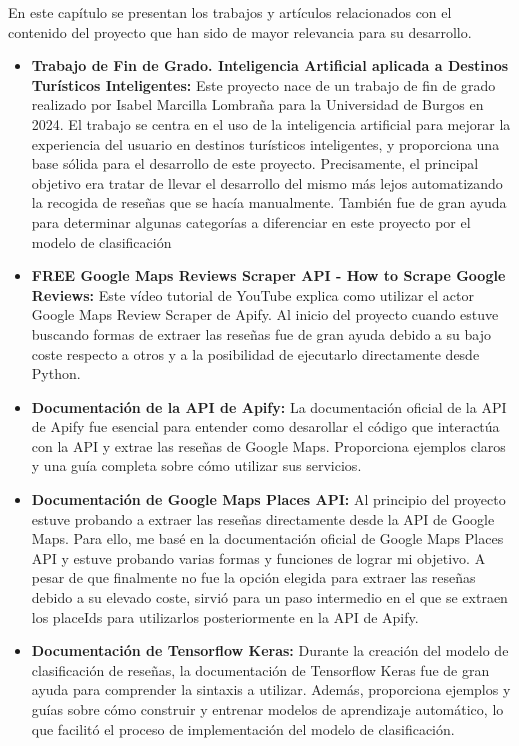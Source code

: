 
En este capítulo se presentan los trabajos y artículos relacionados con el contenido del proyecto que han sido de mayor relevancia para su desarrollo.

\begin{itemize}
    \item \textbf{Trabajo de Fin de Grado. Inteligencia Artificial aplicada a Destinos Turísticos Inteligentes:} Este proyecto nace de un trabajo de fin de grado realizado por Isabel Marcilla Lombraña para la Universidad de Burgos en 2024. El trabajo se centra en el uso de la inteligencia artificial para mejorar la experiencia del usuario en destinos turísticos inteligentes, y proporciona una base sólida para el desarrollo de este proyecto. Precisamente, el principal objetivo era tratar de llevar el desarrollo del mismo más lejos automatizando la recogida de reseñas que se hacía manualmente. También fue de gran ayuda para determinar algunas categorías a diferenciar en este proyecto por el modelo de clasificación\cite{tfg-2024}
    \item \textbf{FREE Google Maps Reviews Scraper API - How to Scrape Google Reviews:} Este vídeo tutorial de YouTube explica como utilizar el actor Google Maps Review Scraper de Apify. Al inicio del proyecto cuando estuve buscando formas de extraer las reseñas fue de gran ayuda debido a su bajo coste respecto a otros y a la posibilidad de ejecutarlo directamente desde Python. \cite{youtube:apify}
    \item \textbf{Documentación de la API de Apify:} La documentación oficial de la API de Apify fue esencial para entender como desarollar el código que interactúa con la API y extrae las reseñas de Google Maps. Proporciona ejemplos claros y una guía completa sobre cómo utilizar sus servicios. \cite{apify:docs} 
    \item \textbf{Documentación de Google Maps Places API:} Al principio del proyecto estuve probando a extraer las reseñas directamente desde la API de Google Maps. Para ello, me basé en la documentación oficial de Google Maps Places API y estuve probando varias formas y funciones de lograr mi objetivo. A pesar de que finalmente no fue la opción elegida para extraer las reseñas debido a su elevado coste, sirvió para un paso intermedio en el que se extraen los placeIds para utilizarlos posteriormente en la API de Apify. \cite{googleplaces:docs}
    \item \textbf{Documentación de Tensorflow Keras:} Durante la creación del modelo de clasificación de reseñas, la documentación de Tensorflow Keras fue de gran ayuda para comprender la sintaxis a utilizar. Además, proporciona ejemplos y guías sobre cómo construir y entrenar modelos de aprendizaje automático, lo que facilitó el proceso de implementación del modelo de clasificación. \cite{tensorflow:keras}
\end{itemize}
